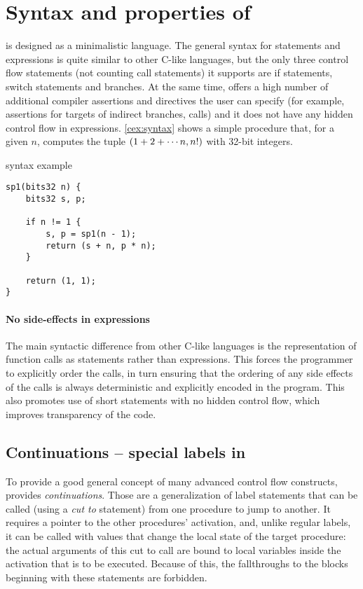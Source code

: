 \section{Syntax and properties of \cmm}

\cmm is designed as a minimalistic language. The general syntax for statements and expressions is quite similar to other C-like languages, but the only three control flow statements (not counting call statements) it supports are if statements, switch statements and branches. At the same time, \cmm offers a high number of additional compiler assertions and directives the user can specify (for example, assertions for targets of indirect branches, calls) and it does not have any hidden control flow in expressions. \cref{cex:syntax} shows a simple procedure  that, for a given $n$, computes the tuple $\left(1 + 2 + \cdots n, n!\right)$ with 32-bit integers.

\begin{codex}
    \caption{\cmm syntax example}
    \label{cex:syntax}

    \begin{lstlisting}
sp1(bits32 n) {
    bits32 s, p;

    if n != 1 {
        s, p = sp1(n - 1);
        return (s + n, p * n);
    }

    return (1, 1);
}
    \end{lstlisting}
\end{codex}

\paragraph{No side-effects in expressions}

The main syntactic difference from other C-like languages is the representation of function calls as statements rather than expressions. This forces the programmer to explicitly order the calls, in turn ensuring that the ordering of any side effects of the calls is always deterministic and explicitly encoded in the program. This also promotes use of short statements with no hidden control flow, which improves transparency of the code.

\subsection{Continuations -- special labels in \cmm}

To provide a good general concept of many advanced control flow constructs, \cmm provides \emph{continuations}. Those are a generalization of label statements that can be called (using a \emph{cut to} statement) from one procedure to jump to another. It requires a pointer to the other procedures' activation, and, unlike regular labels, it can be called with values that change the local state of the target procedure: the actual arguments of this cut to call are bound to local variables inside the activation that is to be executed. Because of this, the fallthroughs to the blocks beginning with these statements are forbidden.

